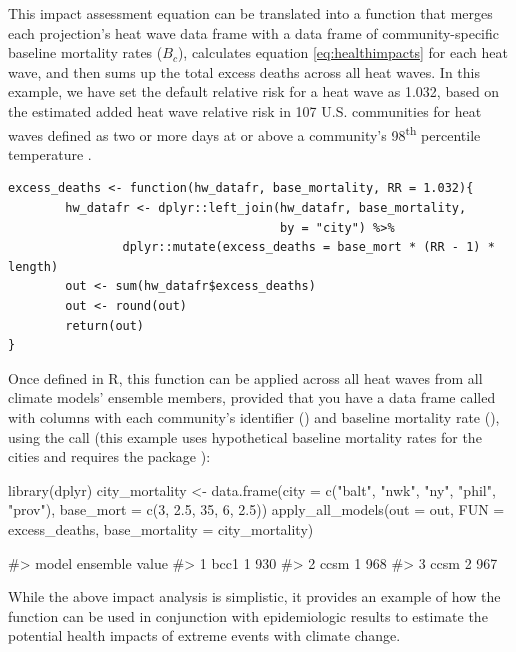This impact assessment equation can be translated into a function that
merges each projection's heat wave data frame with a data frame of
community-specific baseline mortality rates (\(B_c\)), calculates
equation \ref{eq:healthimpacts} for each heat wave, and then sums up the
total excess deaths across all heat waves. In this example, we have set
the default relative risk for a heat wave as 1.032, based on the
estimated added heat wave relative risk in 107 U.S. communities for heat
waves defined as two or more days at or above a community's
98\textsuperscript{th} percentile temperature
\citep{anderson2009weather}.

\begin{verbatim}
excess_deaths <- function(hw_datafr, base_mortality, RR = 1.032){
        hw_datafr <- dplyr::left_join(hw_datafr, base_mortality,
                                      by = "city") %>%
                dplyr::mutate(excess_deaths = base_mort * (RR - 1) * length)
        out <- sum(hw_datafr$excess_deaths)
        out <- round(out)
        return(out)
}
\end{verbatim}

\noindent Once defined in R, this function can be applied across all
heat waves from all climate models' ensemble members, provided that you
have a data frame called  with columns with each
community's identifier () and baseline mortality rate
(), using the call (this example uses hypothetical
baseline mortality rates for the cities and requires the 
package \citep{dplyr}):

\begin{Schunk}
\begin{Sinput}
library(dplyr)
city_mortality <- data.frame(city = c("balt", "nwk", "ny", "phil", "prov"),
                             base_mort = c(3, 2.5, 35, 6, 2.5))
apply_all_models(out = out, FUN = excess_deaths, base_mortality = city_mortality)
\end{Sinput}
\begin{Soutput}
#>   model ensemble value
#> 1  bcc1        1   930
#> 2  ccsm        1   968
#> 3  ccsm        2   967
\end{Soutput}
\end{Schunk}

\noindent While the above impact analysis is simplistic, it provides an
example of how the  function can be used in
conjunction with epidemiologic results to estimate the potential health
impacts of extreme events with climate change.

